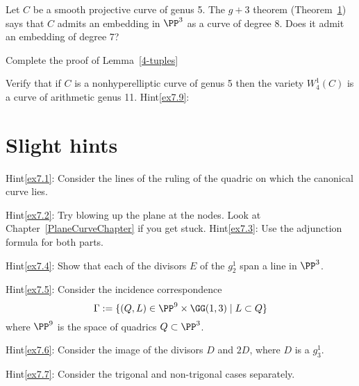 \begin{exercise}\label{ex7.7}
Let $C$ be a smooth projective curve of genus 5. The $g+3$ theorem (Theorem~\ref{}) says that $C$ admits an embedding in $\PP^3$ as a curve of degree 8. Does it admit an embedding of degree 7?
\end{exercise}

\begin{exercise}\label{non-red 4-tuples}\label{ex7.8}
Complete the proof of Lemma~\ref{4-tuples}
\end{exercise}

\begin{exercise}\label{ex7.9}
Verify that if $C$ is a nonhyperelliptic curve of genus 5 then the variety $W^1_4(C)$ is a curve of arithmetic genus 11.
Hint\ref{ex7.9}: \end{exercise}

\section{Slight hints}
Hint\ref{ex7.1}: Consider the lines of the ruling of the quadric on which the canonical curve lies.

Hint\ref{ex7.2}: Try blowing up the plane at the nodes. Look at Chapter~\ref{PlaneCurveChapter} if you get stuck.
Hint\ref{ex7.3}: Use the adjunction formula for both parts.

Hint\ref{ex7.4}: Show that each of the divisors $E$ of the $g^1_2$ span a line in $\PP^3$. 

Hint\ref{ex7.5}: Consider the incidence correspondence
$$
\Gamma := \{ (Q, L) \in \PP^9 \times \GG(1,3) \mid L \subset Q \}
$$
where $\PP^9$ is the space of quadrics $Q\subset \PP^3$.

Hint\ref{ex7.6}: Consider the image of the divisors $D$ and $2D$, where $D$ is a $g^1_3$.

Hint\ref{ex7.7}: Consider the trigonal and non-trigonal cases separately. 




